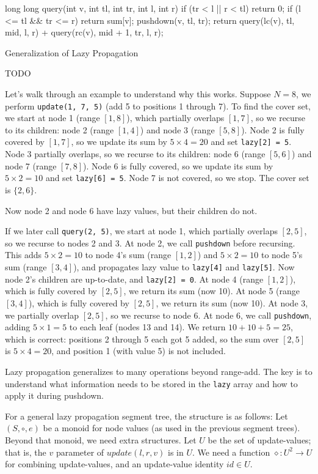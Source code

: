 long long query(int v, int tl, int tr, int l, int r) {
    if (tr < l || r < tl)
    return 0;
    if (l <= tl && tr <= r)
    return sum[v];
    pushdown(v, tl, tr);
    return query(lc(v), tl, mid, l, r) + query(rc(v), mid + 1, tr, l, r);
  }
\endtt

\secc Generalization of Lazy Propagation

TODO

\iffalse
Let's walk through an example to understand why this works. Suppose $N = 8$, we perform {\tt update(1, 7, 5)} (add 5 to positions 1 through 7). To find the cover set, we start at node 1 (range $[1, 8]$), which partially overlaps $[1, 7]$, so we recurse to its children: node 2 (range $[1, 4]$) and node 3 (range $[5, 8]$). Node 2 is fully covered by $[1, 7]$, so we update its sum by $5 \times 4 = 20$ and set {\tt lazy[2] = 5}. Node 3 partially overlaps, so we recurse to its children: node 6 (range $[5, 6]$) and node 7 (range $[7, 8]$). Node 6 is fully covered, so we update its sum by $5 \times 2 = 10$ and set {\tt lazy[6] = 5}. Node 7 is not covered, so we stop. The cover set is $\{2, 6\}$.

Now node 2 and node 6 have lazy values, but their children do not.

If we later call {\tt query(2, 5)}, we start at node 1, which partially overlaps $[2, 5]$, so we recurse to nodes 2 and 3. At node 2, we call {\tt pushdown} before recursing. This adds $5 \times 2 = 10$ to node 4's sum (range $[1, 2]$) and $5 \times 2 = 10$ to node 5's sum (range $[3, 4]$), and propagates lazy value to {\tt lazy[4]} and {\tt lazy[5]}. Now node 2's children are up-to-date, and {\tt lazy[2] = 0}. At node 4 (range $[1, 2]$), which is fully covered by $[2, 5]$, we return its sum (now 10). At node 5 (range $[3, 4]$), which is fully covered by $[2, 5]$, we return its sum (now 10). At node 3, we partially overlap $[2, 5]$, so we recurse to node 6. At node 6, we call {\tt pushdown}, adding $5 \times 1 = 5$ to each leaf (nodes 13 and 14). We return $10 + 10 + 5 = 25$, which is correct: positions 2 through 5 each got 5 added, so the sum over $[2, 5]$ is $5 \times 4 = 20$, and position 1 (with value 5) is not included.


Lazy propagation generalizes to many operations beyond range-add. The key is to understand what information needs to be stored in the {\tt lazy} array and how to apply it during pushdown.

For a general lazy propagation segment tree, the structure is as follows:
Let $(S, \circ, e)$ be a monoid for node values (as used in the previous segment trees). Beyond that monoid, we need extra structures. Let $U$ be the set of update-values; that is, the $v$ parameter of $update(l, r, v)$ is in $U$. We need a function $\diamond : U^2 \rightarrow U$ for combining update-values, and an update-value identity $id \in U$.


